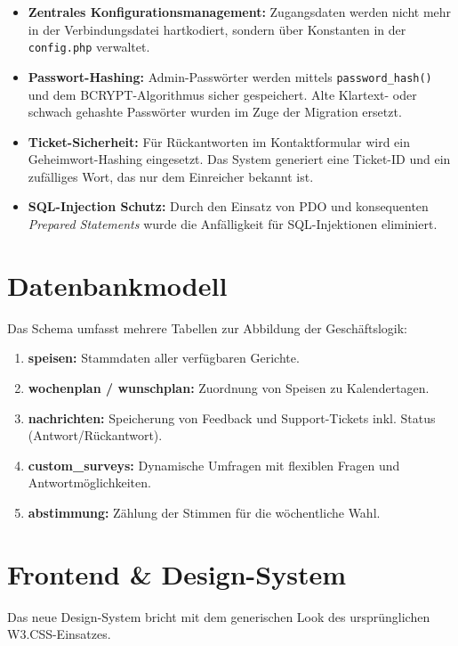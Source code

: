 \documentclass[11pt,
a4paper,
numbers=nonperiod,
footsepline,
oneside,
numbers=noenddot,
bibliography=totoc
]{scrreprt}
\begin{document}
\begin{itemize}
    \item \textbf{Zentrales Konfigurationsmanagement:} Zugangsdaten werden nicht mehr in der Verbindungsdatei hartkodiert, sondern über Konstanten in der \texttt{config.php} verwaltet.
    \item \textbf{Passwort-Hashing:} Admin-Passwörter werden mittels \texttt{password\_hash()} und dem BCRYPT-Algorithmus sicher gespeichert. Alte Klartext- oder schwach gehashte Passwörter wurden im Zuge der Migration ersetzt.
    \item \textbf{Ticket-Sicherheit:} Für Rückantworten im Kontaktformular wird ein Geheimwort-Hashing eingesetzt. Das System generiert eine Ticket-ID und ein zufälliges Wort, das nur dem Einreicher bekannt ist.
    \item \textbf{SQL-Injection Schutz:} Durch den Einsatz von PDO und konsequenten \textit{Prepared Statements} wurde die Anfälligkeit für SQL-Injektionen eliminiert.
\end{itemize}

\chapter{Datenbankmodell}
Das Schema umfasst mehrere Tabellen zur Abbildung der Geschäftslogik:
\begin{enumerate}
    \item \textbf{speisen:} Stammdaten aller verfügbaren Gerichte.
    \item \textbf{wochenplan / wunschplan:} Zuordnung von Speisen zu Kalendertagen.
    \item \textbf{nachrichten:} Speicherung von Feedback und Support-Tickets inkl. Status (Antwort/Rückantwort).
    \item \textbf{custom\_surveys:} Dynamische Umfragen mit flexiblen Fragen und Antwortmöglichkeiten.
    \item \textbf{abstimmung:} Zählung der Stimmen für die wöchentliche Wahl.
\end{enumerate}

\chapter{Frontend \& Design-System}
Das neue Design-System bricht mit dem generischen Look des ursprünglichen W3.CSS-Einsatzes.
\end{document}
